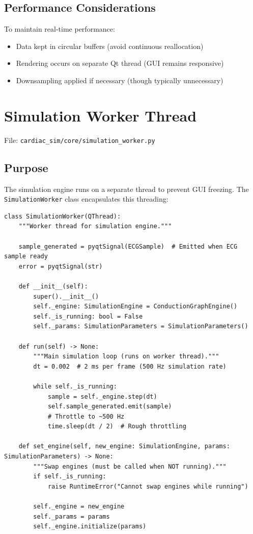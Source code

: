 \documentclass[12pt,a4paper,oneside]{book}
\begin{document}
\subsection{Performance Considerations}

To maintain real-time performance:

\begin{itemize}
    \item Data kept in circular buffers (avoid continuous reallocation)
    \item Rendering occurs on separate Qt thread (GUI remains responsive)
    \item Downsampling applied if necessary (though typically unnecessary)
\end{itemize}

\section{Simulation Worker Thread}

File: \texttt{cardiac\_sim/core/simulation\_worker.py}

\subsection{Purpose}

The simulation engine runs on a separate thread to prevent GUI freezing. The \texttt{SimulationWorker} class encapsulates this threading:

\begin{Verbatim}[formatcom=\color{black}]
class SimulationWorker(QThread):
    """Worker thread for simulation engine."""
    
    sample_generated = pyqtSignal(ECGSample)  # Emitted when ECG sample ready
    error = pyqtSignal(str)
    
    def __init__(self):
        super().__init__()
        self._engine: SimulationEngine = ConductionGraphEngine()
        self._is_running: bool = False
        self._params: SimulationParameters = SimulationParameters()
    
    def run(self) -> None:
        """Main simulation loop (runs on worker thread)."""
        dt = 0.002  # 2 ms per frame (500 Hz simulation rate)
        
        while self._is_running:
            sample = self._engine.step(dt)
            self.sample_generated.emit(sample)
            # Throttle to ~500 Hz
            time.sleep(dt / 2)  # Rough throttling
    
    def set_engine(self, new_engine: SimulationEngine, params: SimulationParameters) -> None:
        """Swap engines (must be called when NOT running)."""
        if self._is_running:
            raise RuntimeError("Cannot swap engines while running")
        
        self._engine = new_engine
        self._params = params
        self._engine.initialize(params)
\end{Verbatim}
\end{document}
